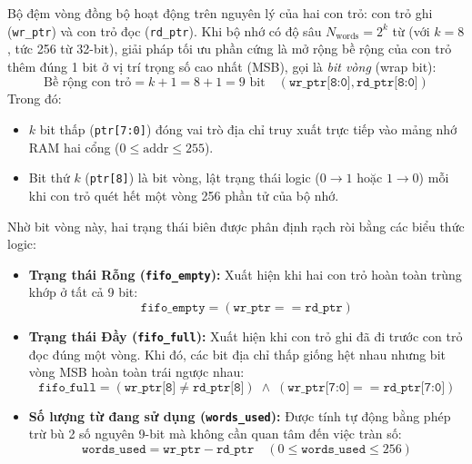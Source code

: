 Bộ đệm vòng đồng bộ hoạt động trên nguyên lý của hai con trỏ: con trỏ ghi (\texttt{wr\_ptr}) và con trỏ đọc (\texttt{rd\_ptr}). Khi bộ nhớ có độ sâu $N_{\text{words}} = 2^k$ từ (với $k = 8$, tức 256 từ 32-bit), giải pháp tối ưu phần cứng là mở rộng bề rộng của con trỏ thêm đúng 1 bit ở vị trí trọng số cao nhất (MSB), gọi là \emph{bit vòng} (wrap bit):
\begin{equation}
\text{Bề rộng con trỏ} = k + 1 = 8 + 1 = 9\text{ bit} \quad (\texttt{wr\_ptr[8:0]}, \texttt{rd\_ptr[8:0]})
\end{equation}
Trong đó:
\begin{itemize}[leftmargin=1.5em, itemsep=2pt]
    \item $k$ bit thấp (\texttt{ptr[7:0]}) đóng vai trò địa chỉ truy xuất trực tiếp vào mảng nhớ RAM hai cổng ($0 \le \text{addr} \le 255$).
    \item Bit thứ $k$ (\texttt{ptr[8]}) là bit vòng, lật trạng thái logic ($0 \to 1$ hoặc $1 \to 0$) mỗi khi con trỏ quét hết một vòng 256 phần tử của bộ nhớ.
\end{itemize}

Nhờ bit vòng này, hai trạng thái biên được phân định rạch ròi bằng các biểu thức logic:
\begin{itemize}[leftmargin=1.5em, itemsep=2pt]
    \item \textbf{Trạng thái Rỗng (\texttt{fifo\_empty}):} Xuất hiện khi hai con trỏ hoàn toàn trùng khớp ở tất cả 9 bit:
    \begin{equation}
    \texttt{fifo\_empty} = (\texttt{wr\_ptr} == \texttt{rd\_ptr})
    \end{equation}
    \item \textbf{Trạng thái Đầy (\texttt{fifo\_full}):} Xuất hiện khi con trỏ ghi đã đi trước con trỏ đọc đúng một vòng. Khi đó, các bit địa chỉ thấp giống hệt nhau nhưng bit vòng MSB hoàn toàn trái ngược nhau:
    \begin{equation}
    \texttt{fifo\_full} = (\texttt{wr\_ptr[8]} \neq \texttt{rd\_ptr[8]}) \;\land\; (\texttt{wr\_ptr[7:0]} == \texttt{rd\_ptr[7:0]})
    \end{equation}
    \item \textbf{Số lượng từ đang sử dụng (\texttt{words\_used}):} Được tính tự động bằng phép trừ bù 2 số nguyên 9-bit mà không cần quan tâm đến việc tràn số:
    \begin{equation}
    \texttt{words\_used} = \texttt{wr\_ptr} - \texttt{rd\_ptr} \quad (0 \le \texttt{words\_used} \le 256)
    \end{equation}
\end{itemize}

